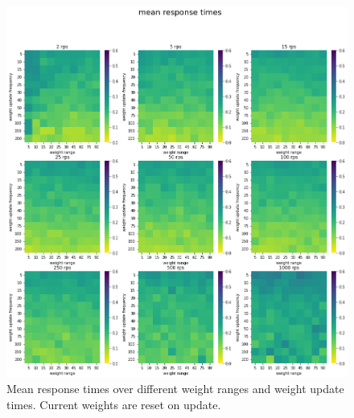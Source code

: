 \begin{figure}
    \centering
    \includegraphics[width=14cm]{graphics/graphs/lb_hyper_mean_with_reset.png}
    \caption{Mean response times over different weight ranges and weight update times. Current weights are reset on update.}
    \label{fig:lb_hyper_reset_mean}
\end{figure}

